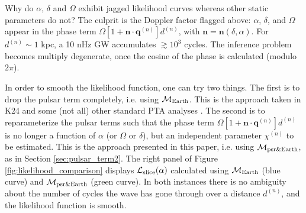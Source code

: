 \documentclass[fleqn,usenatbib,useAMS]{mnras}
\begin{document}
Why do $\alpha$, $\delta$ and $\Omega$ exhibit jagged likelihood curves whereas other static parameters do not? The culprit is the Doppler factor flagged above: $\alpha$, $\delta$, and $\Omega$ appear in the phase term $\Omega \left[1 + \boldsymbol{n}\cdot \boldsymbol{q}^{(n)} \right]  d^{(n)}$, with $\boldsymbol{n} = \boldsymbol{n}(\delta, \alpha)$. For $d^{(n)} \sim 1$ kpc, a 10 nHz GW accumulates $ \gtrsim 10^3$ cycles. The inference problem becomes multiply degenerate, once the cosine of the phase is calculated (modulo $2\pi$). \newline 


In order to smooth the likelihood function, one can try two things. The first is to drop the pulsar term completely, i.e. using $\mathcal{M}_{\rm Earth}$. This is the approach taken in K24 and some (not all) other standard PTA analyses \citep[e.g.][]{Sesana2010,Babak2012,Petiteau2013,Zhu2015,Taylors2016,Goldstein2018,Charisi2023arXiv230403786C}. The second is to reparameterize the pulsar terms such that the phase term $\Omega \left[1 + \boldsymbol{n}\cdot \boldsymbol{q}^{(n)} \right]  d^{(n)}$ is no longer a function of $\alpha$ (or $\Omega$ or $\delta$), but an independent parameter $\chi^{(n)}$ to be estimated. This is the approach presented in this paper, i.e. using $\mathcal{M}_{\rm psr \& Earth}$, as in Section \ref{sec:pulsar_term2}. The right panel of Figure \ref{fig:likelihood_comparison} displays $\mathcal{L}_{\rm slice}(\alpha)$ calculated using $\mathcal{M}_{\rm Earth}$ (blue curve) and $\mathcal{M}_{\rm psr \& Earth}$ (green curve). In both instances there is no ambiguity about the number of cycles the wave has gone through over a distance $d^{(n)}$, and the likelihood function is smooth.










\bsp	%
\label{lastpage}
\end{document}
